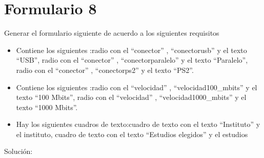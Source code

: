 \documentclass[letterpaper,10pt,spanish]{sphinxmanual}
\begin{document}
\section{Formulario 8}
\label{ejercicios/formularios/anexo_formularios:formulario-8}
Generar el formulario siguiente de acuerdo a los siguientes requisitos
\begin{itemize}
\item {} 
Contiene los siguientes :radio con el   ``conector'' ,   ``conectorusb''  y el texto ``USB'', radio con el   ``conector'' ,   ``conectorparalelo''  y el texto ``Paralelo'', radio con el   ``conector'' ,   ``conectorps2''  y el texto ``PS2''.

\item {} 
Contiene los siguientes :radio con el   ``velocidad'' ,   ``velocidad100\_mbits''  y el texto ``100 Mbits'', radio con el   ``velocidad'' ,   ``velocidad1000\_mbits''  y el texto ``1000 Mbits''.

\item {} 
Hay los siguientes cuadros de texto:cuadro de texto con el texto ``Instituto'' y el  instituto, cuadro de texto con el texto ``Estudios elegidos'' y el  estudios

\end{itemize}


Solución:
\end{document}
